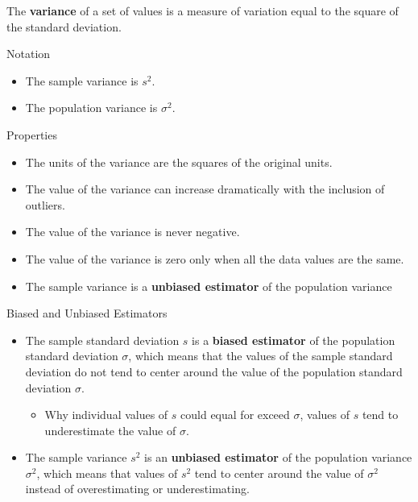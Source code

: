 \documentclass{beamer}
\begin{document}
\begin{frame}
\onslide<+->
\begin{definition}
The \textbf{variance} of a set of values is a measure of variation equal to the square of the standard deviation.
\end{definition}

\onslide<+->
\begin{block}{Notation}
\begin{itemize}
\item The sample variance is $s^2$.
\item The population variance is $\sigma^2$.
\end{itemize}
\end{block}

\begin{block}{Properties}
\begin{itemize}[<+->]
\item The units of the variance are the squares of the original units.
\item The value of the variance can increase dramatically with the inclusion of outliers.
\item The value of the variance is never negative.
\item The value of the variance is zero only when all the data values are the same.
\item The sample variance is a \textbf{unbiased estimator} of the population variance
\end{itemize}
\end{block}
\end{frame}

\begin{frame}
\begin{block}{Biased and Unbiased Estimators}
\begin{itemize}
\item The sample standard deviation $s$ is a \textbf{biased estimator} of the population standard deviation $\sigma$, which means that the values of the sample standard deviation do not tend to center around the value of the population standard deviation $\sigma$.\pause
\begin{itemize}
\item Why individual values of $s$ could equal for exceed $\sigma$, values of $s$ tend to underestimate the value of $\sigma$.\pause
\end{itemize}
\item The sample variance $s^2$ is an \textbf{unbiased estimator} of the population variance $\sigma^2$, which means that values of $s^2$ tend to center around the value of $\sigma^2$ instead of overestimating or underestimating.
\end{itemize}
\end{block}
\end{frame}
\end{document}
